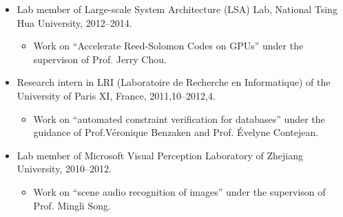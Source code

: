 \documentclass[letterpaper]{article}
\begin{document}
\begin{itemize}
    \item Lab member of Large-scale System Architecture (LSA) Lab, National Tsing Hua University, 2012--2014.
        \begin{itemize}
            \item Work on ``Accelerate Reed-Solomon Codes on GPUs'' under the supervison of Prof. Jerry Chou.
        \end{itemize} 
    \item Research intern in LRI (Laboratoire de Recherche en Informatique) of the University of Paris XI, France, 2011,10--2012,4.
        \begin{itemize}
            \item Work on ``automated constraint verification for databases'' under the guidance of Prof.V\'eronique Benzaken and Prof. \'Evelyne Contejean.


        \end{itemize} 
    \item Lab member of Microsoft Visual Perception Laboratory of Zhejiang University, 2010--2012.
        \begin{itemize}
            \item Work on ``scene audio recognition of images'' under the supervison of Prof. Mingli Song. 



\end{itemize}
\end{itemize}
\end{document}
